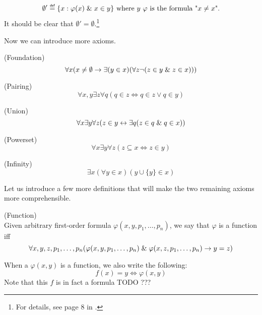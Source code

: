 \begin{equation}
\emptyset' \defeq \{x : \varphi(x) \et x \in y\}\mbox{ where $y$ $\varphi$ is the formula "$x \neq x$".}
\end{equation}
It should be clear that $\emptyset' = \emptyset$.\footnote{For details, see page 8 in \cite{JechBook}.}

Now we can introduce more axioms.
\begin{definition}{(Foundation)}\label{def:foundation}
\begin{equation}
\forall x (x \neq \emptyset \rightarrow \exists (y \in x) (\forall z \neg (z \in y \mathrel{\&} z \in x)))
\end{equation}
\end{definition}

\begin{definition}{(Pairing)}\label{def:pairing}
\begin{equation}
\forall x, y \exists z \forall q (q \in z \iff q \in z \lor q \in y)
\end{equation}
\end{definition}

\begin{definition}{(Union)}\label{def:union}
\begin{equation}
\forall x \exists y \forall z (z \in y \leftrightarrow \exists q( z \in q \mathrel{\&} q \in x))
\end{equation}
\end{definition}

\begin{definition}{(Powerset)}\label{def:powerset}
\begin{equation}
\forall x \exists y \forall z (z \subseteq x \iff z \in y)
\end{equation}
\end{definition}

\begin{definition}{(Infinity)}\label{def:infinity}
\begin{equation}
\exists x (\forall y \in x)(y\cup\{y\} \in x)
\end{equation}
\end{definition}

Let us introduce a few more definitions that will make the two remaining axioms more comprehensible.
\begin{definition}{(Function)}\label{def:function}\\
Given arbitrary first-order formula $\varphi(x, y, p_1, \ldots, p_n)$, we say that $\varphi$ is a function iff
\begin{equation}\label{def:function_formula}
\forall x, y, z, p_1, \ldots, p_n (\varphi(x, y, p_1, \ldots, p_n) \mathrel{\&} \varphi(x, z, p_1, \ldots, p_n) \rightarrow y = z)
\end{equation}
\end{definition}
When a $\varphi(x, y)$ is a function, we also write the following:
\begin{equation}
f(x) = y \iff \varphi(x, y)
\end{equation}
Note that this $f$ is in fact a formula TODO ???

